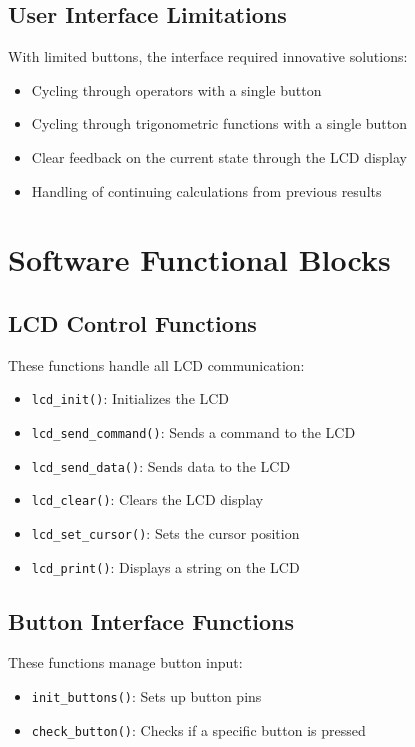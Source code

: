 \documentclass[12pt,a4paper]{article}
\begin{document}
\subsection{User Interface Limitations}
With limited buttons, the interface required innovative solutions:
\begin{itemize}
    \item Cycling through operators with a single button
    \item Cycling through trigonometric functions with a single button
    \item Clear feedback on the current state through the LCD display
    \item Handling of continuing calculations from previous results
\end{itemize}

\section{Software Functional Blocks}
\subsection{LCD Control Functions}
These functions handle all LCD communication:
\begin{itemize}
    \item \texttt{lcd\_init()}: Initializes the LCD
    \item \texttt{lcd\_send\_command()}: Sends a command to the LCD
    \item \texttt{lcd\_send\_data()}: Sends data to the LCD
    \item \texttt{lcd\_clear()}: Clears the LCD display
    \item \texttt{lcd\_set\_cursor()}: Sets the cursor position
    \item \texttt{lcd\_print()}: Displays a string on the LCD
\end{itemize}

\subsection{Button Interface Functions}
These functions manage button input:
\begin{itemize}
    \item \texttt{init\_buttons()}: Sets up button pins
    \item \texttt{check\_button()}: Checks if a specific button is pressed
\end{itemize}
\end{document}

